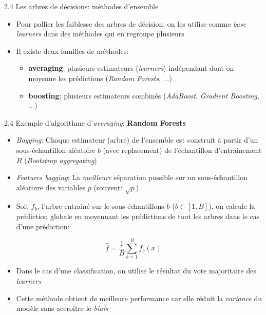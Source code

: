 \begin{frame}{2.4 Les arbres de décisions: méthodes d'ensemble}
  \begin{itemize}
  \item Pour pallier les faiblesse des arbres de décision, on les utilise comme \textit{base learners} dans des méthodes qui en regroupe plusieurs
  \item Il existe deux familles de méthodes:
    \begin{itemize}
      \normalsize
      \vspace{0.5cm}
    \item \textbf{averaging}: plusieurs estimateurs (\textit{learners}) indépendant dont on moyenne les prédictions (\textit{Random Forests}, $\dots$)
      \vspace{0.5cm}
    \item \textbf{boosting}: plusieurs estimateurs combinés (\textit{AdaBoost}, \textit{Gradient Boosting}, $\dots$)
    \end{itemize}
  \end{itemize}
\end{frame}

\begin{frame}{2.4 Exemple d'algorithme d'\textit{averaging}: \textbf{Random Forests}}
  \begin{itemize}
  \item \textit{Bagging}: Chaque estimateur (arbre) de l'ensemble est construit à partir d'un sous-échantillon aléatoire $b$ (avec replacement) de l'échantillon d'entrainement $B$ (\textit{Bootstrap aggregating})
  \item \textit{Features bagging}: La \textit{meilleure} séparation possible sur un sous-échantillon aléatoire des variables $p$ (souvent: $\sqrt{p}$)
  \item Soit $f_{b}$, l'arbre entrainé sur le sous-échantillons $b$ ($b \in[1,B]$), on calcule la prédiction globale en moyennant les prédictions de tout les arbres dans le cas d'une prédiction:
  \end{itemize}
  \begin{equation*}
    \hat{f} = \frac{1}{B}\displaystyle\sum_{b=1}^{B} f_{b}(x)
  \end{equation*}
  \begin{itemize}
  \item Dans le cas d'une classification, on utilise le résultat du vote majoritaire des \textit{learners}
  \item Cette méthode obtient de meilleure performance car elle réduit la \textit{variance} du modèle sans accroitre le \textit{biais}
  \end{itemize}
\end{frame}

